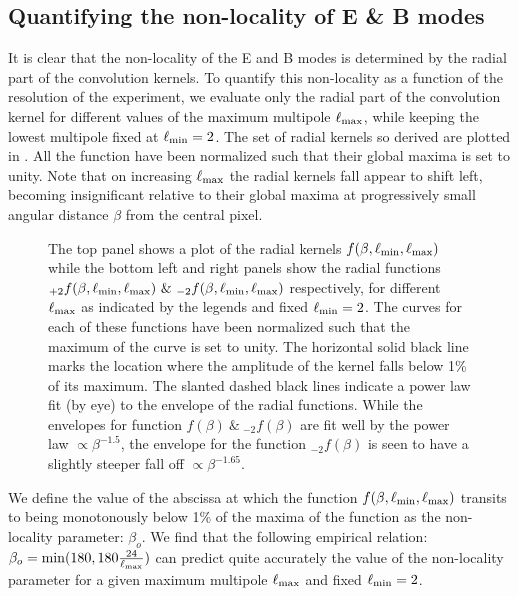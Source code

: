 \subsection{Quantifying the non-locality of E \& B modes} \label{sec:radial_locality}
It is clear that the non-locality of the E and B modes is determined by the radial part of the convolution kernels. To quantify this non-locality as a function of the resolution of the experiment, we evaluate only the radial part of the convolution kernel for different values of the maximum multipole $\ell_{\rm max}$, while keeping the lowest multipole fixed at $\ell_{\rm min}=2$. The set of radial kernels so derived are plotted in . All the function have been normalized such that their global maxima is set to unity. Note that on increasing $\ell_{\rm max}$ the radial kernels fall appear to shift left, becoming insignificant relative  to their global maxima at progressively small angular distance $\beta$ from the central pixel. 
%
\begin{figure}[!t]
\centering
{}
\caption{The top panel shows a plot of the radial kernels $f(\beta,\ell_{\rm min},\ell_{\rm max})$ while the bottom left and right panels show the radial functions ${}_{+2}f(\beta,\ell_{\rm min},\ell_{\rm max}) ~\&~ {}_{-2}f(\beta,\ell_{\rm min},\ell_{\rm max})$ respectively, for different $\ell_{\rm max}$ as indicated by the legends and fixed $\ell_{\rm min}=2$. The curves for each of these functions have been normalized such that the maximum of the curve is set to unity. The horizontal solid black line marks the location where the amplitude of the kernel falls below 1\% of its maximum. The slanted dashed black lines indicate a power law fit (by eye) to the envelope of the radial functions. While the envelopes for function $f(\beta)~\&~ {}_{-2}f(\beta)$ are fit well by the power law $\propto \beta^{-1.5}$, the envelope for the function ${}_{-2}f(\beta)$ is seen to have a slightly steeper fall off $\propto \beta^{-1.65}$.}
\label{fig:rad_ker_decay}
\end{figure}
%
We define the value of the abscissa at which the function $f(\beta,\ell_{\rm min},\ell_{\rm max})$ transits to being monotonously below 1\% of the maxima of the function as the non-locality parameter: $\beta_{o}$. We find that the following empirical relation: $\beta_o= {\rm min}(180,180 \frac{24}{\ell_{\rm max}})$ can predict quite accurately the value of the non-locality parameter for a given maximum multipole $\ell_{\rm max}$ and fixed $\ell_{\rm min}=2$. 

